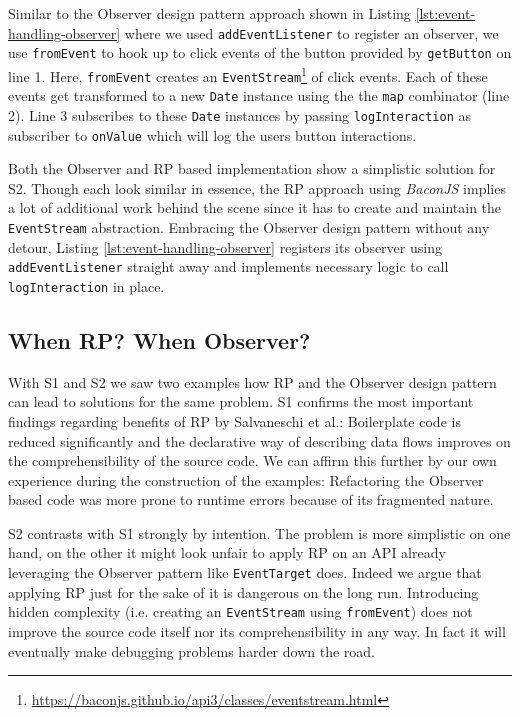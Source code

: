 \documentclass[12pt,a4paper]{article}
\begin{document}
Similar to the Observer design pattern approach shown in Listing \ref{lst:event-handling-observer} where we used \texttt{addEventListener} to register an observer, we use \texttt{fromEvent} to hook up to click events of the button provided by \texttt{getButton} on line 1. Here, \texttt{fromEvent} creates an \texttt{EventStream}\footnote{\url{https://baconjs.github.io/api3/classes/eventstream.html}} of click events. Each of these events get transformed to a new \texttt{Date} instance using the the \texttt{map} combinator (line 2). Line 3 subscribes to these \texttt{Date} instances by passing \texttt{logInteraction} as subscriber to \texttt{onValue} which will log the users button interactions.

Both the Observer and RP based implementation show a simplistic solution for S2. Though each look similar in essence, the RP approach using \emph{BaconJS} implies a lot of additional work behind the scene since it has to create and maintain the \texttt{EventStream} abstraction. Embracing the Observer design pattern without any detour, Listing \ref{lst:event-handling-observer} registers its observer using \texttt{addEventListener} straight away and implements necessary logic to call \texttt{logInteraction} in place.


\subsection{When RP? When Observer?}
\label{sec:when-rp-when-observer}

With S1 and S2 we saw two examples how RP and the Observer design pattern can lead to solutions for the same problem. S1 confirms the most important findings regarding benefits of RP by Salvaneschi et al.: Boilerplate code is reduced significantly and the declarative way of describing data flows improves on the comprehensibility of the source code. We can affirm this further by our own experience during the construction of the examples: Refactoring the Observer based code was more prone to runtime errors because of its fragmented nature.

S2 contrasts with S1 strongly by intention. The problem is more simplistic on one hand, on the other it might look unfair to apply RP on an API already leveraging the Observer pattern like \texttt{EventTarget} does. Indeed we argue that applying RP just for the sake of it is dangerous on the long run. Introducing hidden complexity (i.e. creating an \texttt{EventStream} using \texttt{fromEvent}) does not improve the source code itself nor its comprehensibility in any way. In fact it will eventually make debugging problems harder down the road.
\end{document}

